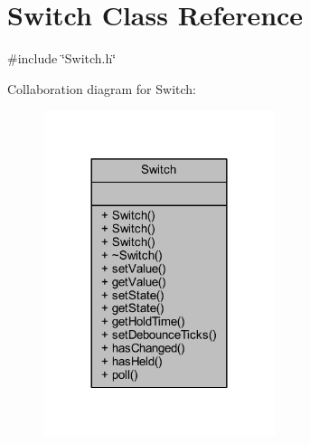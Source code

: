 \hypertarget{class_switch}{}\section{Switch Class Reference}
\label{class_switch}


{\ttfamily \#include \char`\"{}Switch.\+h\char`\"{}}



Collaboration diagram for Switch\+:
\nopagebreak
\begin{figure}[H]
\begin{center}
\leavevmode
\includegraphics[width=192pt]{d6/d28/class_switch__coll__graph}
\end{center}
\end{figure}

